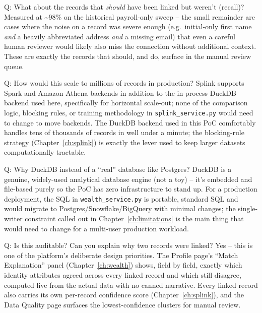 \documentclass[11pt]{report}
\begin{document}
\begin{qabox}{Q: What about the records that \emph{should} have been linked but weren't (recall)?}
Measured at \textasciitilde98\% on the historical payroll-only sweep -- the small remainder are cases where the noise on a record was severe enough (e.g.\ initial-only first name \emph{and} a heavily abbreviated address \emph{and} a missing email) that even a careful human reviewer would likely also miss the connection without additional context. These are exactly the records that should, and do, surface in the manual review queue.
\end{qabox}

\begin{qabox}{Q: How would this scale to millions of records in production?}
Splink supports Spark and Amazon Athena backends in addition to the in-process DuckDB backend used here, specifically for horizontal scale-out; none of the comparison logic, blocking rules, or training methodology in \texttt{splink\_service.py} would need to change to move backends. The DuckDB backend used in this PoC comfortably handles tens of thousands of records in well under a minute; the blocking-rule strategy (Chapter~\ref{ch:splink}) is exactly the lever used to keep larger datasets computationally tractable.
\end{qabox}

\begin{qabox}{Q: Why DuckDB instead of a ``real'' database like Postgres?}
DuckDB is a genuine, widely-used analytical database engine (not a toy) -- it's embedded and file-based purely so the PoC has zero infrastructure to stand up. For a production deployment, the SQL in \texttt{wealth\_service.py} is portable, standard SQL and would migrate to Postgres/Snowflake/BigQuery with minimal changes; the single-writer constraint called out in Chapter~\ref{ch:limitations} is the main thing that would need to change for a multi-user production workload.
\end{qabox}

\begin{qabox}{Q: Is this auditable? Can you explain why two records were linked?}
Yes -- this is one of the platform's deliberate design priorities. The Profile page's ``Match Explanation'' panel (Chapter~\ref{ch:wealth}) shows, field by field, exactly which identity attributes agreed across every linked record and which still disagree, computed live from the actual data with no canned narrative. Every linked record also carries its own per-record confidence score (Chapter~\ref{ch:splink}), and the Data Quality page surfaces the lowest-confidence clusters for manual review.
\end{qabox}
\end{document}
